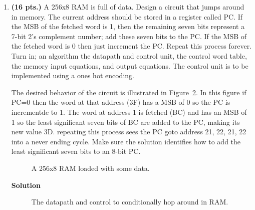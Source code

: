 \begin{enumerate}
        To desired behavior of the circuit is illustrates in
        Figure~\ref{fig:RAMhopper}.  If the address=0 then the circuit will
        jump to address 3F then 28, 53, 3F and continue cycling
        for ever amount these three addresses.

        \begin{figure}[ht]
            \caption{A 256x8 RAM loaded with some data.}
            \label{fig:RAMhopper}
        \end{figure}

    \item \textbf{ (16 pts.)}
        A 256x8 RAM is full of data.  Design a circuit that jumps
        around in memory.   The current address should be stored in a
        register called PC.  If the MSB of the fetched word is 1, then the
        remaining seven bits represent a 7-bit 2's complement number;  add these
        seven bits to the PC.  If the MSB of the fetched word is 0 then just
        increment the PC.  Repeat this process forever.
        Turn in; an algorithm the datapath and control unit, the control word
        table, the memory input equations, and output equations.
        The control unit is to be implemented using a ones hot encoding.

        The desired behavior of the circuit is illustrated in
        Figure~\ref{fig:RAMhopper2}.  In this figure if PC=0 then the word at
        that address (3F) has a MSB of 0 so the PC is incrementde to 1. The
        word at address 1 is fetched (BC) and has an MSB of 1 so the least
        significant seven bits of BC are added to the PC, making its new value
        3D.  repeating this process sees the PC goto address 21, 22, 21, 22
        into a never ending cycle.   Make sure the solution identifies how
        to add the least significant seven bits to an 8-bit PC.

        \begin{figure}[ht]
            \caption{A 256x8 RAM loaded with some data.}
            \label{fig:RAMhopper2}
        \end{figure}

        \begin{onlysolution}  \textbf{Solution} \itshape{

                \begin{figure}[ht]
                    \caption{The datapath and control to conditionally hop around
                    in RAM.}
                \end{figure}

}
\end{onlysolution}
\end{enumerate}
